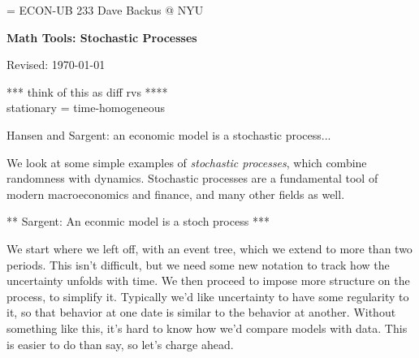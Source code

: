 \documentclass[11pt]{article}
\begin{document}
\parskip=\bigskipamount
\parindent=0.0in
\thispagestyle{empty}
{\large ECON-UB 233 \hfill Dave Backus @ NYU}

\bigskip\bigskip
\centerline{\Large \bf Math Tools:  Stochastic Processes}
\centerline{Revised: \today}


\begin{comment}
{\bf
*** Meyn and Tweedie re stability \\
*** Recursive approach \\
*** Limiting behavior of mean and (esp) variance \\
*** Law of iterated expectations
}
\end{comment}

*** think of this as diff rvs **** \\
stationary = time-homogeneous

\bigskip
Hansen and Sargent:  an economic model is a stochastic process...

We look at some simple examples of {\it stochastic processes\/},
which combine randomness with dynamics.
Stochastic processes are a fundamental tool of modern macroeconomics and finance,
and many other fields as well.

** Sargent:  An econmic model is a stoch process ***


We start where we left off,  with an event tree,
which we extend to more than two periods.
This isn't difficult, but we need some new notation to track how
the uncertainty unfolds with time.
We then proceed to impose more structure on the process, to simplify it.
Typically we'd like uncertainty to have some regularity to it,
so that behavior at one date is similar to the behavior at another.
Without something like this, it's hard to know how we'd compare models with data.
This is easier to do than say, so let's charge ahead.
\end{document}
